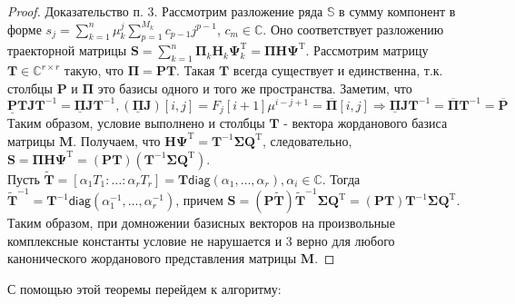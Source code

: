\documentclass[specialist, substylefile = spbureport.rtx, subf,href,colorlinks=true, 12pt]{disser}
\theoremstyle{definition}
\begin{document}
\begin{proof}
Доказательство п. 3. Рассмотрим разложение ряда $\mathbb{S}$ в сумму компонент в форме $s_j = \sum_{k = 1}^{n} \mu_k^j \sum_{p = 1}^{M_k} c_{p - 1}j^{p - 1}$, $c_m \in \mathbb{C}$. Оно соответствует разложению траекторной матрицы $\mathbf{S} = \sum_{k = 1}^{n}\mathbf{\Pi}_k\mathbf{H}_k \mathbf{\Psi}_k^{\mathrm{T}} = \mathbf{\Pi H\Psi}^{\mathrm{T}}$. Рассмотрим матрицу $\mathbf{T} \in \mathbb{C}^{r \times r}$ такую, что $\mathbf{\Pi} = \mathbf{PT}$. Такая $\mathbf{T}$ всегда существует и единственна, т.к. столбцы $\mathbf{P}$ и $\mathbf{\Pi}$ это базисы одного и того же пространства. Заметим, что 
\begin{equation*}
   \underline{\mathbf{P}}\mathbf{TJ}\mathbf{T}^{-1}
   = \underline{\mathbf{\Pi}}\mathbf{JT}^{-1},
   ( \underline{\mathbf{\Pi}}\mathbf{J})[i, j] = F_j[i + 1]\mu^{i - j + 1} = \overline{\mathbf{\Pi}}[i, j] \Rightarrow
\underline{\mathbf{\Pi}}\mathbf{JT}^{-1} =    \overline{\mathbf{\Pi}}\mathbf{T}^{-1} = \overline{\mathbf{P}}
\end{equation*}
Таким образом, условие выполнено и столбцы $\mathbf{T}$ - вектора жорданового базиса матрицы $\mathbf{M}$.
Получаем, что $\mathbf{H\Psi}^{\mathrm{T}} = \mathbf{T}^{-1}\mathbf{\Sigma Q}^{\mathrm{T}}$, следовательно, $\mathbf{S} = \mathbf{\Pi H\Psi}^{\mathrm{T}} = (\mathbf{PT})(\mathbf{T}^{-1}\mathbf{\Sigma Q}^{\mathrm{T}})$. \\
\hspace*{0.5cm} Пусть $\widetilde{\mathbf{T}} = [\alpha_1T_1: \dots :\alpha_rT_r] = \mathbf{T}\mathsf{diag}(\alpha_1, \dots ,\alpha_r), \alpha_i \in \mathbb{C}$. Тогда\\ $\widetilde{\mathbf{T}}^{-1} = \mathbf{T}^{-1}\mathsf{diag}(\alpha_1^{-1}, \dots ,\alpha_r^{-1})$, причем $\mathbf{S} = (\mathbf{P}\widetilde{\mathbf{T}})\widetilde{\mathbf{T}}^{-1}\mathbf{\Sigma Q}^{\mathrm{T}} = (\mathbf{P}\mathbf{T})\mathbf{T}^{-1}\mathbf{\Sigma Q}^{\mathrm{T}}$. Таким образом, при домножении базисных векторов
на произвольные комплексные константы условие не нарушается и 3
верно для любого канонического жорданового представления матрицы $\mathbf{M}$.
\end{proof}

С помощью этой теоремы перейдем к алгоритму:
\end{document}
